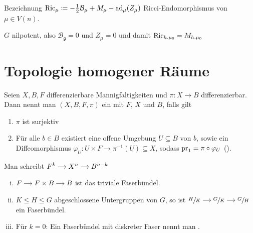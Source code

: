 Bezeichnung $\operatorname{Ric}_\mu \coloneqq -\frac{1}{2} \mathcal{B}_\mu + M_\mu - \operatorname{ad}_\mu(Z_\mu)$ Ricci-Endomorphismus von $\mu \in V(n)$.

\begin{bemerkung*}
	$G$ nilpotent, also $\mathcal{B}_\mathfrak{g} =0$ und $Z_\mu =0$ und damit $\operatorname{Ric}_{h.\mu_0}=M_{h.\mu_0}$
\end{bemerkung*}

\newpage
\section{Topologie homogener Räume} %
\label{sec:33}

\begin{definition}
	Seien $X,B,F$ differenzierbare Mannigfaltigkeiten und $\pi \colon X \to B$ differenzierbar.
	Dann nennt man $(X,B,F,\pi)$ ein  mit   $F$,  $X$  und  $B$, falls gilt 
	\begin{enumerate}[1)]
		\item $\pi$ ist surjektiv
		\item Für alle $b \in B$ existiert eine offene Umgebung $U \subseteq B$ von $b$, sowie ein Diffeomorphismus $\varphi_U \colon U \times F \to \pi^{-1}(U) \subseteq X$, sodass $\operatorname{pr}_1 = \pi \circ \varphi_U$ ().
	\end{enumerate}
	Man schreibt 
	\(
		\begin{tikzcd}[cramped,sep=small]
			F^k \rar & X^n \rar & B^{n-k}
		\end{tikzcd}
	\)
\end{definition}

\begin{beispiel*}
	\begin{enumerate}[(i)]
		\item \(
			\begin{tikzcd}[cramped,sep=small]
				F \rar & F \times B \rar & B
			\end{tikzcd} 
		\)
		ist das triviale Faserbündel.
		\item $K \le H \le G$ abgeschlossene Untergruppen von $G$, so ist 
		\(
			\begin{tikzcd}[cramped,sep=small]
				\sfrac{H}{K} \rar & \sfrac{G}{K} \rar & \sfrac{G}{H}
			\end{tikzcd}
		\)
		ein Faserbündel.
		\item Für $k=0$: Ein Faserbündel mit diskreter Faser nennt man .
	\end{enumerate}
\end{beispiel*}

